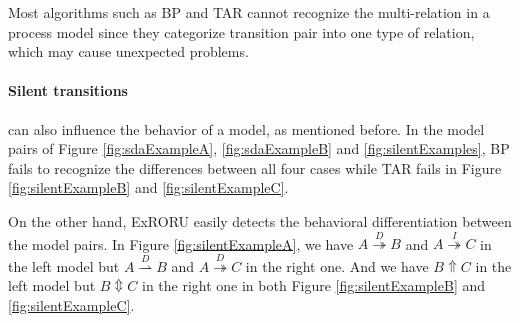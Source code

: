 \documentclass[dvips,...]{llncs}
\begin{document}
Most algorithms such as BP and TAR cannot recognize the multi-relation in a process model since they categorize transition pair into one type of relation, which may cause unexpected problems.

\paragraph{Silent transitions} can also influence the behavior of a model, as mentioned before. In the model pairs of Figure \ref{fig:sdaExampleA}, \ref{fig:sdaExampleB} and \ref{fig:silentExamples}, BP fails to recognize the differences between all four cases while TAR fails in Figure \ref{fig:silentExampleB} and \ref{fig:silentExampleC}. 

On the other hand, ExRORU easily detects the behavioral differentiation between the model pairs. In Figure \ref{fig:silentExampleA}, we have $A\overset{D}{\twoheadrightarrow}B$ and $A\overset{I}{\twoheadrightarrow}C$ in the left model but $A\overset{D}{\rightharpoonup}B$ and $A\overset{D}{\twoheadrightarrow}C$ in the right one. And we have $B\Uparrow C$ in the left model but $B\Updownarrow C$ in the right one in both Figure \ref{fig:silentExampleB} and \ref{fig:silentExampleC}.
\end{document}
